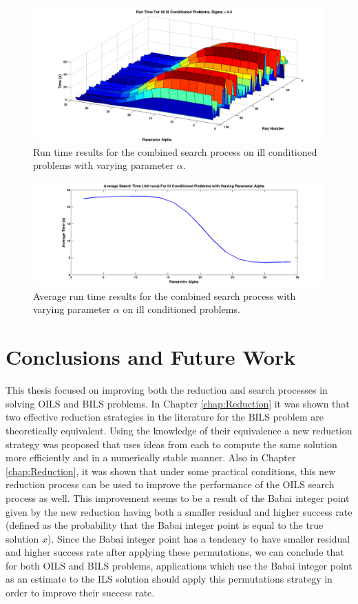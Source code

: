 \documentclass[12pt,Bold,letterpaper]{mcgilletdclass}
\begin{document}
\begin{figure}
\centering
\includegraphics[scale=0.36]{illConditionedSearch.png}
\caption{Run time results for the combined search process on ill conditioned problems with varying parameter $\alpha$.}
\label{fig:illConditionedSearch}
\end{figure}

\begin{figure}
\centering
\includegraphics[scale=0.36]{averageSearchTimesIll.png}
\caption{Average run time results for the combined search process with varying parameter $\alpha$ on ill conditioned problems.}
\label{fig:searchAverageIll}
\end{figure}

\chapter{Conclusions and Future Work} \label{chap:Conclusion}

This thesis focused on improving both the reduction and search processes in solving OILS and BILS problems. In Chapter \ref{chap:Reduction} it was shown that two effective reduction strategies in the literature for the BILS problem are theoretically equivalent. Using the knowledge of their equivalence a new reduction strategy was proposed that uses ideas from each to compute the same solution more efficiently and in a numerically stable manner. Also in Chapter \ref{chap:Reduction}, it was shown that under some practical conditions, this new reduction process can be used to improve the performance of the OILS search process as well. This improvement seems to be a result of the Babai integer point given by the new reduction having both a smaller residual and higher success rate (defined as the probability that the Babai integer point is equal to the true solution $x$). Since the Babai integer point has a tendency to have smaller residual and higher success rate after applying these permutations, we can conclude that for both OILS and BILS problems, applications which use the Babai integer point as an estimate to the ILS solution should apply this permutations strategy in order to improve their success rate.
\end{document}
